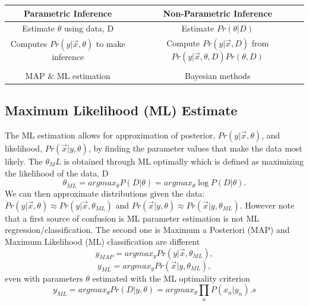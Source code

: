 \documentclass[12pt]{article}
\numberwithin{equation}{section}
\begin{document}
\begin{table}[!ht]
\begin{center}
\begin{tabular}{|c|c|}
\hline
\textbf{Parametric Inference}  & \textbf{Non-Parametric Inference} \\ \hline
Estimate $\theta$ using data, D & Estimate $Pr(\theta| D)$ \\ \hline
Computes $Pr(y|\vec{x},\theta)$ to make inference  & Compute $Pr(y | \vec{x},D)$ from $Pr(y | \vec{x},\theta, D) Pr(\theta, D)$\\ \hline
{\color{blue}{Learning corresponds to estimating $\theta$} } & {\color{red}{The number of parameters can grow with data} } \\  \hline
MAP \& ML estimation& Bayesian methods \\  \hline
\end{tabular}
\end{center}
\label{default}
\end{table}%

\subsection{Maximum Likelihood (ML) Estimate}
The ML estimation allows for approximation of posterior, $Pr(y|\vec{x},\theta)$, and likelihood, $Pr(\vec{x}|y,\theta)$, by finding the parameter values that make the data most likely. The $\theta_ML$ is obtained through ML optimally which is defined as maximizing the likelihood of the data, D 
\begin{equation}
\theta_{ML} = arg max_\theta P(D | \theta) = arg max_\theta \log P(D | \theta).
\end{equation}
We can then approximate distributions given the data: $Pr(y|\vec{x},\theta) \approx Pr(y|\vec{x},\theta_{ML})$ and $Pr(\vec{x}|y,\theta)\approx Pr(\vec{x}|y,\theta_{ML})$. However note that a first source of confusion is ML parameter estimation is not ML regression/classification. The second one is Maximum a Posteriori (MAP) and Maximum Likelihood (ML) classification are different 
\begin{equation}
y_{MAP} = arg max_y Pr(y|\vec{x},\theta_{ML}),
\end{equation}
\begin{equation}
y_{ML} = arg max_y Pr(\vec{x}|y,\theta_{ML}),
\end{equation}
even with parameters $\theta$ estimated with the ML optimality criterion 
\begin{equation}
y_{ML} = arg max_\theta Pr(D|y,\theta) = arg max_\theta \prod_n P(x_n|y_n).s
\end{equation}
\end{document}
